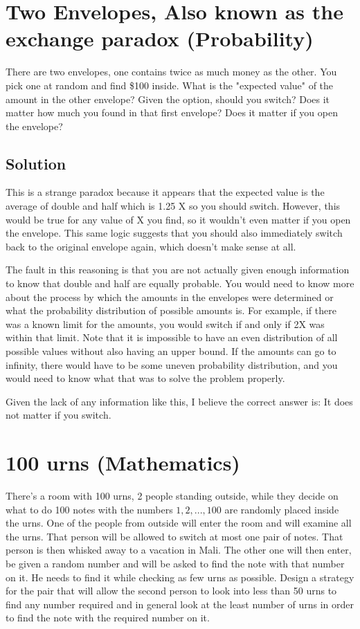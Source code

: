 \documentclass{article}
\begin{document}
\section{Two Envelopes, Also known as the exchange paradox (Probability)}
There are two envelopes, one contains twice as much money as the other. You pick one at random and find \$100 inside. What is the "expected value" of the amount in the other envelope? Given the option, should you switch? Does it matter how much you found in that first envelope? Does it matter if you open the envelope?

\subsection{Solution}
This is a strange paradox because it appears that the expected value is the average of double and half which is 1.25 X so you should switch. However, this would be true for any value of X you find, so it wouldn't even matter if you open the envelope. This same logic suggests that you should also immediately switch back to the original envelope again, which doesn't make sense at all.

The fault in this reasoning is that you are not actually given enough information to know that double and half are equally probable. You would need to know more about the process by which the amounts in the envelopes were determined or what the probability distribution of possible amounts is. For example, if there was a known limit for the amounts, you would switch if and only if 2X was within that limit. Note that it is impossible to have an even distribution of all possible values without also having an upper bound. If the amounts can go to infinity, there would have to be some uneven probability distribution, and you would need to know what that was to solve the problem properly.

Given the lack of any information like this, I believe the correct answer is: It does not matter if you switch.

\section{100 urns (Mathematics)}
There's a room with 100 urns, 2 people standing outside, while they decide on what to do 100 notes with the numbers $1, 2, ...,100$ are randomly placed inside the urns. One of the people from outside will enter the room and will examine all the urns. That person will be allowed to switch at most one pair of notes. That person is then whisked away to a vacation in Mali. The other one will then enter, be given a random number and will be asked to find the note with that number on it. He needs to find it while checking as few urns as possible. Design a strategy for the pair that will allow the second person to look into less than 50 urns to find any number required and in general look at the least number of urns in order to find the note with the required number on it.
\end{document}
